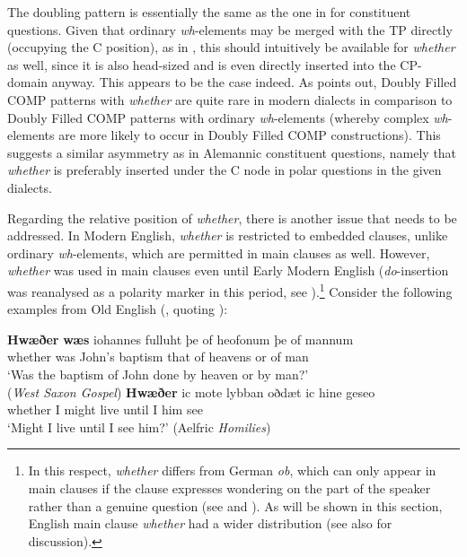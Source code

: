 The doubling pattern is essentially the same as the one in  for constituent questions. Given that ordinary \textit{wh}-elements may be merged with the TP directly (occupying the C position), as in , this should intuitively be available for \textit{whether} as well, since it is also head-sized and is even directly inserted into the CP-domain anyway. This appears to be the case indeed. As \citet{vangelderen2009} points out, Doubly Filled COMP patterns with \textit{whether} are quite rare in modern dialects in comparison to Doubly Filled COMP patterns with ordinary \textit{wh}-elements (whereby complex \textit{wh}-elements are more likely to occur in Doubly Filled COMP constructions). This suggests a similar asymmetry as in Alemannic constituent questions, namely that \textit{whether} is preferably inserted under the C node in polar questions in the given dialects.

Regarding the relative position of \textit{whether}, there is another issue that needs to be addressed. In Modern English, \textit{whether} is restricted to embedded clauses, unlike ordinary \textit{wh}-elements, which are permitted in main clauses as well. However, \textit{whether} was used in main clauses even until Early Modern English (\textit{do}-insertion was reanalysed as a polarity marker in this period, see \citealt{wallage2015}).\footnote{In this respect, \textit{whether} differs from German \textit{ob}, which can only appear in main clauses if the clause expresses wondering on the part of the speaker rather than a genuine question (see \citealt{gutzmann2011} and \citealt{zimmermann2013}). As will be shown in this section, English main clause \textit{whether} had a wider distribution (see also \citealt{bacskaiatkari2019me} for discussion).} Consider the following examples from Old English (\citealt[141, ex. 15--16]{vangelderen2009}, quoting \citealt{allen1980}):

\ea \label{oepattern}
\ea \gll \textbf{Hwæðer} \textbf{wæs} iohannes fulluht þe of heofonum þe of mannum \label{whetherwas}\\
whether was John's baptism that of heavens or of man\\
\glt `Was the baptism of John done by heaven or by man?'\\(\textit{West Saxon Gospel})
\ex \gll \textbf{Hwæðer} ic mote lybban oðdæt ic hine geseo \label{whether}\\
whether I might live until I him see\\
\glt `Might I live until I see him?' (Aelfric \textit{Homilies})
\z
\z

